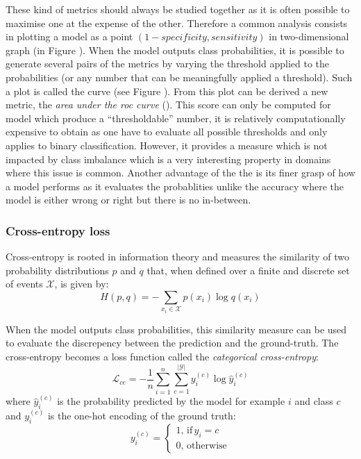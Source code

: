 These kind of metrics should always be studied together as it is often possible to maximise one at the expense of the other. Therefore a common analysis consists in plotting a model as a point $(1 - \textit{specificity}, \textit{sensitivity})$ in two-dimensional graph (in Figure ). When the model outputs class probabilities, it is possible to generate several pairs of the metrics by varying the threshold applied to the probabilities (or any number that can be meaningfully applied a threshold). Such a plot is called the  curve (see Figure ). From this plot can be derived a new metric, the \textit{area under the \acrshort{roc} curve} (\rocauc). This score can only be computed for model which produce a ``thresholdable'' number, it is relatively computationally expensive to obtain as one have to evaluate all possible thresholds and only applies to binary classification. However, it provides a measure which is not impacted by class imbalance which is a very interesting property in domains where this issue is common. Another advantage of the the \rocaucs is its finer grasp of how a model performs as it evaluates the probablities unlike the accuracy where the model is either wrong or right but there is no in-between.

\subsubsection{Cross-entropy loss}
\label{sssec:backml:metric:crossentropy}

Cross-entropy is rooted in information theory and measures the similarity of two probability distributions $p$ and $q$ that, when defined over a finite and discrete set of events $\mathcal{X}$, is given by:
\begin{equation}
\label{eqn:backml:crossentropy}
H(p, q) = - \sum\limits_{x_i \in \mathcal{X}} p\left(x_i\right) \log q\left(x_i\right)
\end{equation}

When the model outputs class probabilities, this similarity measure can be used to evaluate the discrepency between the prediction and the ground-truth. The cross-entropy becomes a loss function called the \textit{categorical cross-entropy}:
\begin{equation}
\label{eqn:backml:crossentropyloss}
\mathcal{L}_{ce} = - \frac{1}{n} \sum\limits_{i=1}^n \sum\limits_{c=1}^{\left|\mathcal{Y}\right|} y^{(c)}_{i} \log \hat{y}^{(c)}_i
\end{equation}
where $\hat{y}^{(c)}_i$ is the probability predicted by the model for example $i$ and class $c$ and $y^{(c)}_i$ is the one-hot encoding of the ground truth:
\begin{equation}
\label{eqn:backml:onehotencoding}
y^{(c)}_i = 
\begin{cases}
1,\,\text{if}\, y_i = c \\
0,\,\text{otherwise}
\end{cases}
\end{equation} 

